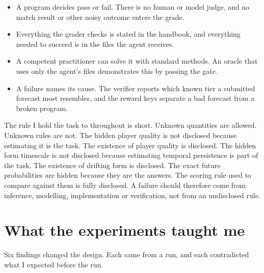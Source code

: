 \documentclass[11pt,letterpaper]{article}
\begin{document}
\begin{itemize}[leftmargin=1.4em, itemsep=2pt]
\item A program decides pass or fail. There is no human or model judge, and no match result or other noisy outcome enters the grade.
\item Everything the grader checks is stated in the handbook, and everything needed to succeed is in the files the agent receives.
\item A competent practitioner can solve it with standard methods. An oracle that uses only the agent's files demonstrates this by passing the gate.
\item A failure names its cause. The verifier reports which known tier a submitted forecast most resembles, and the reward keys separate a bad forecast from a broken program.
\end{itemize}

The rule I hold the task to throughout is short. Unknown quantities are allowed. Unknown rules are not. The hidden player quality is not disclosed because estimating it is the task. The existence of player quality is disclosed. The hidden form timescale is not disclosed because estimating temporal persistence is part of the task. The existence of drifting form is disclosed. The exact future probabilities are hidden because they are the answers. The scoring rule used to compare against them is fully disclosed. A failure should therefore come from inference, modelling, implementation or verification, not from an undisclosed rule.


\section{What the experiments taught me}

Six findings changed the design. Each came from a run, and each contradicted what I expected before the run.
\end{document}
